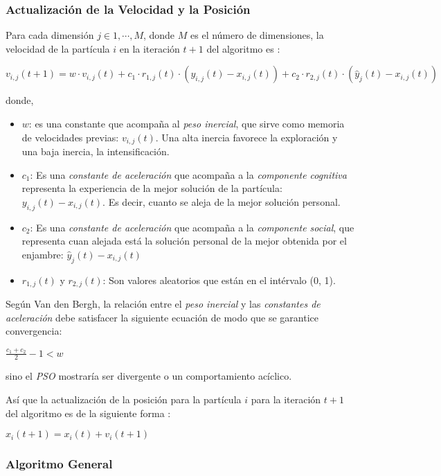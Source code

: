 \subsubsection{Actualización de la Velocidad y la Posición}

    Para cada dimensión $j \in {1, \cdots, M}$, donde $M$ es el número de
dimensiones, la velocidad de la partícula $i$ en la iteración $t + 1$ del
algoritmo es \cite{PSO_0}:
\begin{center}
$v_{i,j}(t + 1) = w \cdot v_{i,j}(t) + c_1 \cdot r_{1,j}(t) \cdot (y_{i,j}(t) - x_{i,j}(t)) + c_2 \cdot r_{2,j}(t) \cdot (\hat{y}_j(t) - x_{i,j}(t))$
\end{center}
donde,
\begin{itemize}
    \item $w$: es una constante que acompaña al \emph{peso inercial}, que sirve
como memoria de velocidades previas: $v_{i,j}(t)$. Una alta inercia favorece la
exploración y una baja inercia, la intensificación.
    \item $c_1$: Es una \emph{constante de aceleración} que acompaña a la
\emph{componente cognitiva} representa la experiencia de la mejor solución de
la partícula: $y_{i,j} (t) - x_{i,j}(t)$. Es decir, cuanto se aleja de la mejor
solución personal.
    \item $c_2$: Es una \emph{constante de aceleración} que acompaña a la
\emph{componente social}, que representa cuan alejada está la solución personal
de la mejor obtenida por el enjambre: $\hat{y}_j(t)-x_{i,j}(t)$
    \item $r_{1,j}(t)$ y $r_{2,j}(t)$: Son valores aleatorios que están en el
intérvalo (0, 1).
\end{itemize}

    Según Van den Bergh\cite{PSO_3}, la relación entre el \emph{peso inercial} y
las \emph{constantes de aceleración} debe satisfacer la siguiente ecuación de modo que
se garantice convergencia:
\begin{center}
$\displaystyle\frac{c_1 + c_2}{2} - 1 < w$
\end{center}
sino el \emph{PSO} mostraría ser divergente o un comportamiento acíclico.

    Así que la actualización de la posición para la partícula $i$ para la
iteración $t + 1$ del algoritmo es de la siguiente forma \cite{PSO_0}:
\begin{center}
$x_i(t + 1) = x_i(t) + v_i(t + 1)$
\end{center}

\subsubsection{Algoritmo General}

